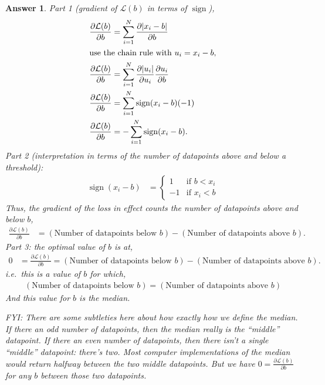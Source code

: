 \documentclass{article}
\newtheorem{answer}{Answer}
\newcommand{\dd}[2][]{\frac{\partial #1}{\partial #2}}
\renewcommand{\L}{\mathcal{L}}
\begin{document}
\begin{answer}
  Part 1 (gradient of $\L(b)$ in terms of $\operatorname{sign}$),
  \begin{align}
    \dd[\L(b)]{b} &= \sum_{i=1}^N \dd[|x_i - b|]{b} \\
    \intertext{use the chain rule with $u_i = x_i-b$,}
    \dd[\L(b)]{b} &= \sum_{i=1}^N \dd[|u_i|]{u_i} \dd[u_i]{b}\\
    \dd[\L(b)]{b} &= \sum_{i=1}^N \operatorname{sign}(x_i - b) (-1)\\
    \dd[\L(b)]{b} &= - \sum_{i=1}^N \operatorname{sign}(x_i - b).
  \end{align}
  Part 2 (interpretation in terms of the number of datapoints above and below a threshold):  
  \begin{align}
    \operatorname{sign}(x_i - b) &= 
    \begin{cases}
      1 & \text{if } b < x_i\\
      -1 & \text{if } x_i < b
    \end{cases}
  \end{align}
  Thus, the gradient of the loss in effect counts the number of datapoints above and below $b$,
  \begin{align}
    \dd[\L(b)]{b} &= (\text{Number of datapoints below } b) - (\text{Number of datapoints above } b).
  \end{align}
  Part 3: the optimal value of $b$ is at,
  \begin{align}
     0 &=\dd[\L(b)]{b} = (\text{Number of datapoints below } b) - (\text{Number of datapoints above } b).
  \end{align}
  i.e.\ this is a value of $b$ for which,
  \begin{align}
     (\text{Number of datapoints below } b) = (\text{Number of datapoints above } b)
  \end{align}
  And this value for $b$ is the median.

  FYI: There are some subtleties here about how exactly how we define the median.
  If there an odd number of datapoints, then the median really is the ``middle'' datapoint.
  If there an even number of datapoints, then there isn't a single ``middle'' datapoint: there's two.  Most computer implementations of the median would return halfway between the two middle datapoints.  But we have $0 =\dd[\L(b)]{b}$ for any $b$ between those two datapoints.  
\end{answer}
\end{document}
